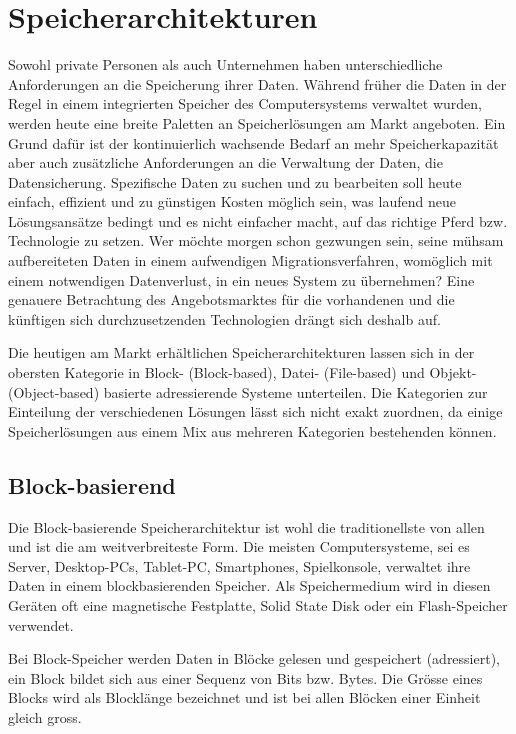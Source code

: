 \cleardoublepage
\chapter{Speicherarchitekturen}

Sowohl private Personen als auch Unternehmen haben unterschiedliche Anforderungen an die Speicherung ihrer Daten. Während früher die Daten in der Regel in einem integrierten Speicher des Computersystems verwaltet wurden, werden heute eine breite Paletten an Speicherlösungen am Markt angeboten. Ein Grund dafür ist der kontinuierlich wachsende Bedarf an mehr Speicherkapazität aber auch zusätzliche Anforderungen an die Verwaltung der Daten, die Datensicherung. Spezifische Daten zu suchen und zu bearbeiten soll heute einfach, effizient und zu günstigen Kosten möglich sein, was laufend neue Lösungsansätze bedingt und es nicht einfacher macht, auf das richtige Pferd bzw. Technologie zu setzen. Wer möchte morgen schon gezwungen sein, seine mühsam aufbereiteten Daten in einem aufwendigen Migrationsverfahren, womöglich mit einem notwendigen Datenverlust, in ein neues System zu übernehmen? Eine genauere Betrachtung des Angebotsmarktes für die vorhandenen und die künftigen sich durchzusetzenden Technologien drängt sich deshalb auf.

Die heutigen am Markt erhältlichen Speicherarchitekturen lassen sich in der obersten Kategorie  in Block- (Block-based), Datei- (File-based) und Objekt- (Object-based) basierte adressierende Systeme unterteilen. Die Kategorien zur Einteilung der verschiedenen Lösungen lässt sich nicht exakt zuordnen, da einige Speicherlösungen aus einem Mix aus mehreren Kategorien bestehenden können.

\section{Block-basierend}
Die Block-basierende Speicherarchitektur ist wohl die traditionellste von allen und ist die am weitverbreiteste Form. Die meisten Computersysteme, sei es Server, Desktop-PCs, Tablet-PC, Smartphones, Spielkonsole, verwaltet ihre Daten in einem blockbasierenden Speicher. Als Speichermedium wird in diesen Geräten oft eine magnetische Festplatte, Solid State Disk oder ein Flash-Speicher verwendet.

Bei Block-Speicher werden Daten in Blöcke gelesen und gespeichert (adressiert), ein Block bildet sich aus einer Sequenz von Bits bzw. Bytes. Die Grösse eines Blocks wird als Blocklänge bezeichnet und ist bei allen Blöcken einer Einheit gleich gross. 


